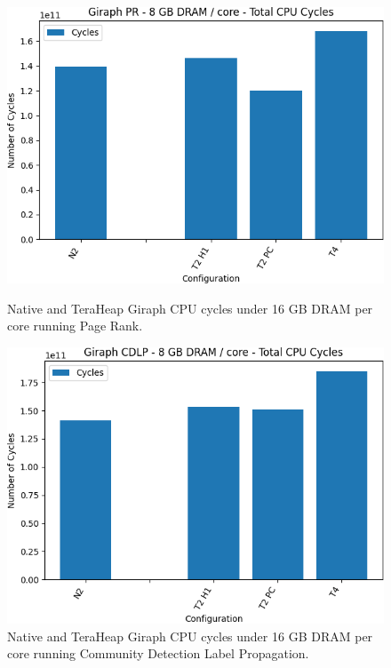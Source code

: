 \begin{figure}[thbp]
        \centering
        \includegraphics[width=\linewidth]{./fig/g_pr128_cycles.png}
    \caption{Native and TeraHeap Giraph CPU cycles under 16 GB DRAM per core running Page Rank.}
                \label{fig:g_pr128_cycles}

        \includegraphics[width=\linewidth]{./fig/g_cdlp128_cycles.png}
    \caption{Native and TeraHeap Giraph CPU cycles under 16 GB DRAM per core running Community Detection Label Propagation.}
                \label{fig:g_cdlp128_cycles}
\end{figure}

